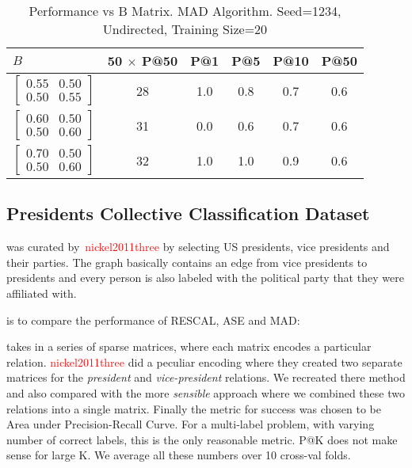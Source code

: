 \documentclass{tufte-handout}
\renewcommand{\cite}[1]{\textcolor{red}{#1}}
\begin{document}
\begin{table}[!htbp]
  \begin{tabular}{l c c c c c}
    $B$ & 50 $\times$ P@50 & P@1 & P@5 & P@10 & P@50 \\ \toprule
  $\begin{bmatrix} 0.55 & 0.50 \\0.50 &0.55 \end{bmatrix}$ & 28 & 1.0 & 0.8 & 0.7 & 0.6 \\
  $\begin{bmatrix} 0.60 & 0.50 \\0.50 &0.60 \end{bmatrix}$ & 31 & 0.0 & 0.6 & 0.7 & 0.6 \\
  $\begin{bmatrix} 0.70 & 0.50 \\0.50 &0.60 \end{bmatrix}$ & 32 & 1.0 & 1.0 & 0.9 & 0.6 \\
  \end{tabular}
  \caption{Performance vs B Matrix. MAD Algorithm. Seed=1234, Undirected, Training Size=20}
  \label{tab:perf-vs-b}
\end{table}

\pagebreak
\subsection{Presidents Collective Classification Dataset}
\label{sec:pres-coll-class}
 was
curated by~\cite{nickel2011three} by selecting US presidents, vice
presidents and their parties. The graph basically contains an edge
from vice presidents to presidents and every person is also labeled with
the political party that they were affiliated with.

 is to compare the performance of
RESCAL, ASE and MAD:

 takes in a series of sparse matrices, where each
matrix encodes a particular relation. \cite{nickel2011three} did a peculiar encoding
where they created two separate matrices for the \textit{president} and
\textit{vice-president} relations. We recreated there method and also compared with
the more \textit{sensible} approach where we combined these two relations into
a single matrix. Finally the metric for success was chosen to be Area under Precision-Recall
Curve. For a multi-label problem, with varying number of correct labels, this is the only reasonable metric.
P@K does not make sense for large K. We average all these numbers over 10 cross-val folds.
\end{document}
